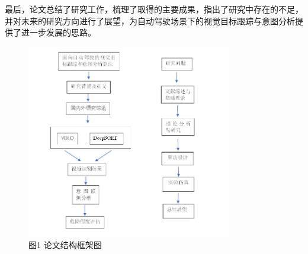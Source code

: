 最后，论文总结了研究工作，梳理了取得的主要成果，指出了研究中存在的不足，并对未来的研究方向进行了展望，为自动驾驶场景下的视觉目标跟踪与意图分析提供了进一步发展的思路。
\begin{figure}[htbp]
    \centering
    \includegraphics[width=0.8\textwidth]{images/p1_struct.png} %
    \caption{图1 论文结构框架图}
    \label{fig:example_image} %
\end{figure}




\begin{tabular}{l l}
\end{tabular}